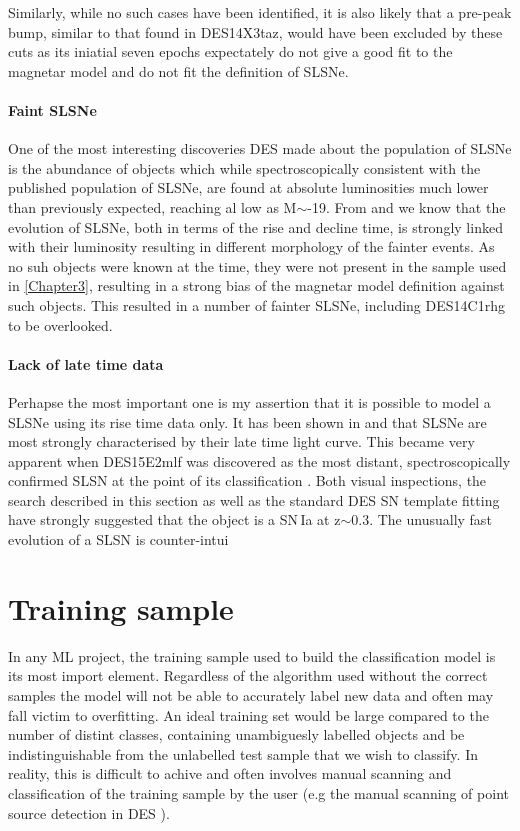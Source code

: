 Similarly, while no such cases have been identified, it is also likely that a pre-peak bump, similar to that found in DES14X3taz, would have been excluded by these cuts as its iniatial seven epochs expectately do not give a good fit to the magnetar model and do not fit the definition of SLSNe.

\paragraph{Faint SLSNe}
One of the most interesting discoveries DES made about the population of SLSNe is the abundance of objects which while spectroscopically consistent with the published population of SLSNe, are found at absolute luminosities much lower than previously expected, reaching al low as M$\sim$-19. From \citet{Inserra2018a} and \citet{Nicholl2014, Nicholl2017} we know that the evolution of SLSNe, both in terms of the rise and decline time, is strongly linked with their luminosity resulting in different morphology of the fainter events. As no suh objects were known at the time, they were not present in the sample used in \cref{Chapter3}, resulting in a strong bias of the magnetar model definition against such objects. This resulted in a number of fainter SLSNe, including DES14C1rhg to be overlooked.

\paragraph{Lack of late time data}
 Perhapse the most important one is my assertion that it is possible to model a SLSNe using its rise time data only. It has been shown in \citet{Inserra2013} and \citet{Inserra2018a} that SLSNe are most strongly characterised by their late time light curve. This became very apparent when DES15E2mlf was discovered as the most distant, spectroscopically confirmed SLSN at the point of its classification \citep{Pan2017}. Both visual inspections, the search described in this section as well as the standard DES SN template fitting have strongly suggested that the object is a SN\,Ia at z$\sim$0.3. The unusually fast evolution of a SLSN is counter-intui

\section{Training sample} \label{sec:TrainingSample}
In any ML project, the training sample used to build the classification model is its most import element. Regardless of the algorithm used without the correct samples the model will not be able to accurately label new data and often may fall victim to overfitting. An ideal training set would be large compared to the number of distint classes, containing unambiguesly labelled objects and be indistinguishable from the unlabelled test sample that we wish to classify. In reality, this is difficult to achive and often involves manual scanning and classification of the training sample by the user (e.g the manual scanning of point source detection in DES \citep[][and similar studies]{Goldstein2015}).

